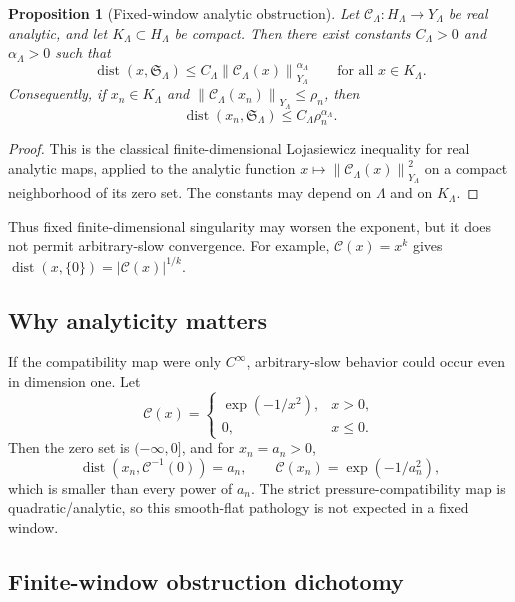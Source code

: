 \documentclass[11pt]{article}
\numberwithin{equation}{section}
\newtheorem{proposition}[theorem]{Proposition}
\DeclareMathOperator{\dist}{dist}
\newcommand{\norm}[2]{\left\|#1\right\|_{#2}}
\newcommand{\calC}{\mathcal C}
\newcommand{\frakS}{\mathfrak S}
\begin{document}
\begin{proposition}[Fixed-window analytic obstruction]\label{prop:fixed-window-lojasiewicz}
Let \(\calC_\Lambda:H_\Lambda\to Y_\Lambda\) be real analytic, and let \(K_\Lambda\subset H_\Lambda\) be compact.  Then there exist constants \(C_\Lambda>0\) and \(\alpha_\Lambda>0\) such that
\begin{equation}\label{eq:lojasiewicz-window}
\dist(x,\frakS_\Lambda)
\le
C_\Lambda\norm{\calC_\Lambda(x)}{Y_\Lambda}^{\alpha_\Lambda}
\qquad
\text{for all }x\in K_\Lambda.
\end{equation}
Consequently, if \(x_n\in K_\Lambda\) and \(\norm{\calC_\Lambda(x_n)}{Y_\Lambda}\le\rho_n\), then
\[
\dist(x_n,\frakS_\Lambda)\le C_\Lambda\rho_n^{\alpha_\Lambda}.
\]
\end{proposition}

\begin{proof}
This is the classical finite-dimensional Lojasiewicz inequality for real analytic maps, applied to the analytic function \(x\mapsto\norm{\calC_\Lambda(x)}{Y_\Lambda}^2\) on a compact neighborhood of its zero set.  The constants may depend on \(\Lambda\) and on \(K_\Lambda\).
\end{proof}

Thus fixed finite-dimensional singularity may worsen the exponent, but it does not permit arbitrary-slow convergence.  For example, \(\calC(x)=x^k\) gives \(\dist(x,\{0\})=|\calC(x)|^{1/k}\).

\subsection{Why analyticity matters}

If the compatibility map were only \(C^\infty\), arbitrary-slow behavior could occur even in dimension one.  Let
\[
\calC(x)=
\begin{cases}
\exp(-1/x^2),& x>0,\\
0,& x\le0.
\end{cases}
\]
Then the zero set is \((-
\infty,0]\), and for \(x_n=a_n>0\),
\[
\dist(x_n,\calC^{-1}(0))=a_n,
\qquad
\calC(x_n)=\exp(-1/a_n^2),
\]
which is smaller than every power of \(a_n\).  The strict pressure-compatibility map is quadratic/analytic, so this smooth-flat pathology is not expected in a fixed window.

\subsection{Finite-window obstruction dichotomy}
\end{document}
